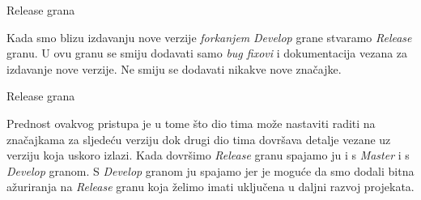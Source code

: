 \documentclass[10pt]{beamer}
\begin{document}
\begin{frame}{Release grana}

Kada smo blizu izdavanju nove verzije \textit{forkanjem} \textit{Develop} grane stvaramo \textit{Release} granu.
U ovu granu se smiju dodavati samo \textit{bug fixovi} i dokumentacija vezana za izdavanje nove verzije. Ne smiju se dodavati nikakve nove značajke.

{
\setlength{\fboxsep}{1pt}
\setlength{\fboxrule}{1pt}
}

\end{frame}

\begin{frame}{Release grana}

Prednost ovakvog pristupa je u tome što dio tima može nastaviti raditi na značajkama za sljedeću verziju dok drugi dio tima dovršava detalje vezane uz verziju koja uskoro izlazi.
Kada dovršimo \textit{Release} granu spajamo ju i s \textit{Master} i s \textit{Develop} granom. S \textit{Develop} granom ju spajamo jer je moguće da smo dodali bitna ažuriranja na \textit{Release} granu koja želimo imati uključena u daljni razvoj projekata.

\end{frame}


\end{document}
